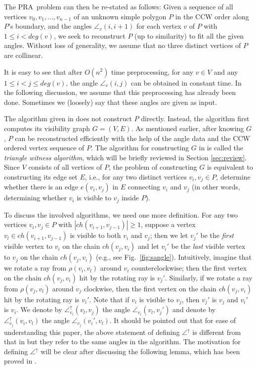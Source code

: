 \documentclass[11pt]{article}
\def\pra{PRA}
\def\sangle{\angle^{\uparrow}}
\begin{document}
The \pra\ problem can then be
re-stated as follows: Given a sequence of all vertices
$v_0,v_1,\ldots,v_{n-1}$ of an unknown simple polygon $P$ in the CCW order along
$P$'s boundary, and the angles $\angle_v(i,i+1)$ for each vertex $v$ of $P$ with
$1\leq i< deg(v)$, we seek to reconstruct $P$ (up to
similarity) to fit all the given angles. 
Without loss of generality, we assume that no three distinct vertices of $P$ are collinear.

It is easy to see that after $O(n^2)$ time preprocessing, for any $v\in V$ and any
$1\leq i< j\leq deg(v)$, the angle $\angle_v(i,j)$ can be obtained
in constant time. In the following discussion, we assume that this
preprocessing has already been done. Sometimes we (loosely) say that these
angles are given as input.

The algorithm given in \cite{ref:DisserRe10} does not construct $P$ directly.
Instead, the algorithm first computes its visibility graph $G=(V,E)$. 
As mentioned earlier, after knowing $G$, $P$ can be reconstructed efficiently with
the help of the angle data and the CCW ordered vertex sequence of $P$. 
The algorithm for constructing $G$ in \cite{ref:DisserRe10} is
called the {\em triangle witness algorithm}, which will be briefly reviewed
in Section \ref{sec:review}.
Since $V$ consists of all vertices of $P$, the
problem of constructing $G$ is equivalent to constructing its edge set
$E$, i.e., for any two distinct vertices $v_i, v_j\in P$, 
determine whether there is an edge $e(v_i,v_j)$ in $E$ connecting $v_i$
and $v_j$ (in other words,
determining whether $v_i$ is visible to $v_j$ inside $P$).


To discuss the involved algorithms, we need one more definition.
For any two vertices $v_i,v_j\in P$ with
$|ch(v_{i+1},v_{j-1})|\geq 1$, 
suppose a vertex $v_l\in ch(v_{i+1},v_{j-1})$ 
is visible to both $v_i$ and $v_j$; then we let $v_j'$ be the
{\em first} visible vertex to $v_i$ on the chain $ch(v_j,v_i)$ and let
$v_i'$ be the {\em last} visible vertex to $v_j$ on the chain $ch(v_j,v_i)$
(e.g., see Fig.~\ref{fig:sangle}). Intuitively, imagine that we
rotate a ray from $\rho(v_i,v_l)$ around $v_i$
counterclockwise; then the first vertex on the chain
$ch(v_j,v_i)$ hit by the rotating ray  is $v_j'$.
Similarly, if we rotate a ray from
$\rho(v_j,v_l)$ around $v_j$ clockwise,
then the first vertex on the chain $ch(v_j,v_i)$ hit by
the rotating ray is $v_i'$. 
Note that if $v_i$ is visible to $v_j$, then
$v_j'$ is $v_j$ and $v_i'$ is $v_i$.  We denote by 
$\sangle_{v_i}(v_l,v_j)$ the angle $\angle_{v_i}(v_l,v_j')$ and denote
by $\sangle_{v_j}(v_i,v_l)$ the angle $\angle_{v_j}(v_i',v_l)$. It should be 
pointed out that for ease of understanding this paper, the above statement of defining $\sangle$ 
is different from that in \cite{ref:DisserRe10} but they refer to the
same angles in the algorithm. The motivation for
defining $\sangle$ will be clear after discussing the
following lemma, which has been proved in \cite{ref:DisserRe10}. 
\end{document}
